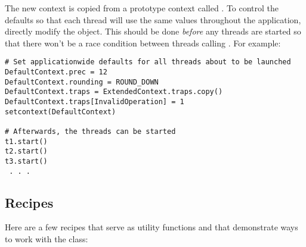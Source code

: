 The new context is copied from a prototype context called
. To control the defaults so that each thread will use the
same values throughout the application, directly modify the
 object. This should be done \emph{before} any threads are
started so that there won't be a race condition between threads calling
. For example:

\begin{verbatim}
# Set applicationwide defaults for all threads about to be launched
DefaultContext.prec = 12
DefaultContext.rounding = ROUND_DOWN
DefaultContext.traps = ExtendedContext.traps.copy()
DefaultContext.traps[InvalidOperation] = 1
setcontext(DefaultContext)

# Afterwards, the threads can be started
t1.start()
t2.start()
t3.start()
 . . .
\end{verbatim}



\subsection{Recipes \label{decimal-recipes}}

Here are a few recipes that serve as utility functions and that demonstrate
ways to work with the  class:


